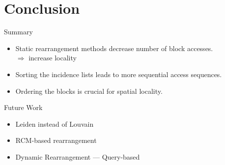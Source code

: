 \documentclass[rgb]{beamer}
\begin{document}
    \section{Conclusion}
        \begin{frame}{Summary}
            \begin{itemize}
                \item Static rearrangement methods decrease number of block accesses. \\
                $\Rightarrow$ increase locality \\ [1em]
                \item Sorting the incidence lists leads to more sequential access sequences. \\ [1em]
                \item Ordering the blocks is crucial for spatial locality.
                \end{itemize}
        \end{frame}
    
        \begin{frame}{Future Work}
        \begin{itemize}
            \item Leiden instead of Louvain \\ [2em]
            \item RCM-based rearrangement \\ [2em]
            \item  Dynamic Rearrangement --- Query-based
        \end{itemize}
        \end{frame}
\end{document}
